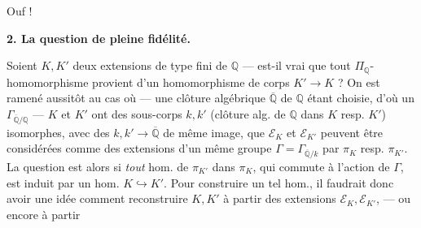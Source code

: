 \documentclass[11pt,a4paper]{article}
\begin{document}
Ouf !


\textbf{2. La question de pleine fidélité.}

Soient $K, K'$ deux extensions de type fini de $\mathbb{Q}$ — est-il vrai que tout $\Pi_{\mathbb{Q}}$-homomorphisme  provient d'un homomorphisme de corps $K' \to K$ ?
On est ramené aussitôt au cas où — une clôture algébrique $\overline{\mathbb{Q}}$ de $\mathbb{Q}$ étant choisie, d'où un $\Gamma_{\overline{\mathbb{Q}}/\mathbb{Q}}$ — $K$ et $K'$ ont des sous-corps $k, k'$ (clôture alg. de $\mathbb{Q}$ dans $K$ resp. $K'$) isomorphes, avec des   $k, k' \to \overline{\mathbb{Q}}$ de même image,   que $\mathcal{E}_K$ et $\mathcal{E}_{K'}$ peuvent être considérées comme des extensions d'un même groupe $\Gamma = \Gamma_{\overline{\mathbb{Q}}/k}$ par $\pi_K$ resp. $\pi_{K'}$. La question est alors si \emph{tout} hom. de $\pi_{K'}$ dans $\pi_K$, qui commute à l'action de $\Gamma$, est induit par un hom. $K \hookrightarrow K'$. Pour construire un tel hom., il faudrait donc avoir une idée comment reconstruire $K, K'$ à partir des extensions $\mathcal{E}_K, \mathcal{E}_{K'}$, — ou encore à partir
\end{document}
